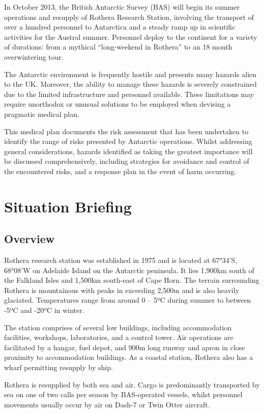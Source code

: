 \documentclass[12pt,a4paper]{article}
\begin{document}
In October 2013, the British Antarctic Survey (BAS) will begin its summer operations and resupply of Rothera Research Station, involving the transport of over a hundred personnel to Antarctica and a steady ramp up in scientific activities for the Austral summer. Personnel deploy to the continent for a variety of durations: from a mythical ``long-weekend in Rothera'' to an 18 month overwintering tour.

The Antarctic environment is frequently hostile and presents many hazards alien to the UK. Moreover, the ability to manage these hazards is severely constrained due to the limited infrastructure and personnel available. These limitations may require unorthodox or unusual solutions to be employed when devising a pragmatic medical plan.

This medical plan documents the risk assessment that has been undertaken to identify the range of risks presented by Antarctic operations. Whilst addressing general considerations, hazards identified as taking the greatest importance will be discussed comprehensively, including strategies for avoidance and control of the encountered risks, and a response plan in the event of harm occurring.

\section{Situation Briefing}

\subsection{Overview}

Rothera research station was established in 1975 and is located at 67°34'S, 68°08'W on Adelaide Island on the Antarctic peninsula. It lies 1,900km south of the Falkland Isles and 1,500km south-east of Cape Horn. The terrain surrounding Rothera is mountainous with peaks in exceeding 2,500m and is also heavily glaciated. Temperatures range from around 0 -- 5ºC during summer to between -5ºC and -20ºC in winter.

The station comprises of several low buildings, including accommodation facilities, workshops, laboratories, and a control tower. Air operations are facilitated by a hangar, fuel depot, and 900m long runway and apron in close proximity to accommodation buildings. As a coastal station, Rothera also has a wharf permitting resupply by ship.

Rothera is resupplied by both sea and air. Cargo is predominantly transported by sea on one of two calls per season by BAS-operated vessels, whilst personnel movements usually occur by air on Dash-7 or Twin Otter aircraft.
\end{document}
